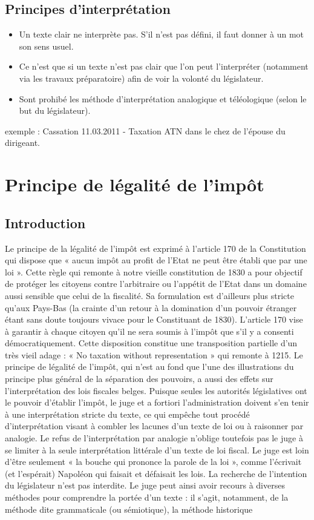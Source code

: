 \documentclass{book}
\begin{document}
\subsection*{Principes d'interprétation}
\begin{itemize}
\item Un texte clair ne interprète pas. S'il n'est pas défini, il faut donner à un mot son sens usuel.
\item Ce n'est que si un texte n'est pas clair que l'on peut l'interpréter (notamment via les travaux préparatoire) afin de voir la volonté du législateur.
\item Sont prohibé les méthode d'interprétation analogique et téléologique (selon le but du législateur).
\end{itemize}

exemple : Cassation 11.03.2011 - Taxation ATN dans le chez de l'épouse du dirigeant.

\section*{Principe de légalité de l'impôt}
\subsection*{Introduction}

Le principe de la légalité de l’impôt est exprimé à l’article 170 de la Constitution qui dispose que « aucun impôt au profit de l’Etat ne peut être établi que par une loi ». Cette règle qui remonte à notre vieille constitution de 1830 a pour objectif de protéger les citoyens contre l’arbitraire ou l’appétit de l’Etat dans un domaine aussi sensible que celui de la ﬁscalité. Sa formulation est d’ailleurs plus stricte qu’aux Pays-Bas (la crainte d’un retour à la domination d’un pouvoir étranger étant sans doute toujours vivace pour le Constituant de 1830). L’article 170 vise à garantir à chaque citoyen qu’il ne sera soumis à l’impôt que s’il y a consenti démocratiquement. Cette disposition constitue une transposition partielle d’un très vieil adage : « No taxation without representation » qui remonte à 1215. Le principe de légalité de l’impôt, qui n’est au fond que l’une des illustrations du principe plus général de la séparation des pouvoirs, a aussi des effets sur l’interprétation des lois ﬁscales belges. Puisque seules les autorités législatives ont le pouvoir d’établir l’impôt, le juge et a fortiori l’administration doivent s’en tenir à une interprétation stricte du texte, ce qui empêche tout procédé d’interprétation visant à combler les lacunes d’un texte de loi ou à raisonner par analogie. Le refus de l’interprétation par analogie n’oblige toutefois pas le juge à se limiter à la seule interprétation littérale d’un texte de loi ﬁscal. Le juge est loin d’être seulement « la bouche qui prononce la parole de la loi », comme l’écrivait (et l’espérait) Napoléon qui faisait et défaisait les lois. La recherche de l’intention du législateur n’est pas interdite. Le juge peut ainsi avoir recours à diverses méthodes pour comprendre la portée d’un texte : il s’agit, notamment, de la méthode dite grammaticale (ou sémiotique), la méthode historique
\end{document}
